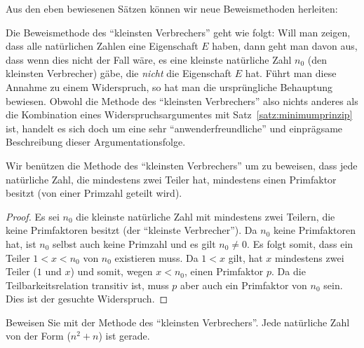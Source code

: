 Aus den eben bewiesenen Sätzen können wir neue Beweismethoden herleiten:

\begin{rk}
Die Beweismethode des ``kleinsten Verbrechers'' geht wie folgt: Will man zeigen, dass alle natürlichen Zahlen eine Eigenschaft $E$ haben, dann geht man davon aus, dass wenn dies nicht der Fall wäre, es eine kleinste natürliche Zahl $n_0$ (den kleinsten Verbrecher) gäbe, die \textit{nicht} die Eigenschaft $E$ hat. Führt man diese Annahme zu einem Widerspruch, so hat man die ursprüngliche Behauptung bewiesen. Obwohl die Methode des ``kleinsten Verbrechers'' also nichts anderes als die Kombination eines Widerspruchsargumentes mit Satz~\ref{satz:minimumprinzip} ist, handelt es sich doch um eine sehr ``anwenderfreundliche'' und einprägsame Beschreibung dieser Argumentationsfolge.
\end{rk}

\begin{bsp}
Wir benützen die Methode des ``kleinsten Verbrechers'' um zu beweisen, dass jede natürliche Zahl, die mindestens zwei Teiler hat, mindestens einen Primfaktor besitzt (von einer Primzahl geteilt wird).
\begin{proof}
Es sei $n_0$ die kleinste natürliche Zahl mit mindestens zwei Teilern, die keine Primfaktoren besitzt (der ``kleinste Verbrecher''). Da $n_0$ keine Primfaktoren hat, ist $n_0$ selbst auch keine Primzahl und es gilt $n_0\neq 0$. Es folgt somit, dass ein Teiler $1<x<n_0$ von $n_0$ existieren muss. Da $1<x$ gilt, hat $x$ mindestens zwei Teiler ($1$ und $x$) und somit, wegen $x<n_0$, einen Primfaktor $p$. Da die Teilbarkeitsrelation transitiv ist, muss $p$ aber auch ein Primfaktor von $n_0$ sein. Dies ist der gesuchte Widerspruch.
\end{proof}
\end{bsp}

\begin{ueb}
	Beweisen Sie mit der Methode des ``kleinsten Verbrechers''.
	Jede natürliche Zahl von der Form ($n^2+n$) ist gerade.
\end{ueb}
\begin{lsg}
\end{lsg}

